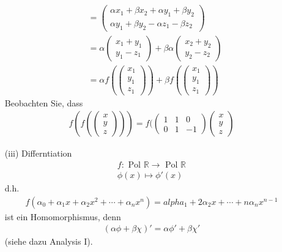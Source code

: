 \documentclass[11pt]{report}
\newcommand*\Zb[1] {\mathbb{#1}}
\begin{document}
\begin{itemize}
\begin{align}
 &= \begin{pmatrix} \alpha x_1 + \beta x_2 + \alpha y_1 + \beta y_2 \\ \alpha y_1 + \beta y_2 - \alpha z_1 - \beta z_2\end{pmatrix}\\
 &= \alpha \begin{pmatrix} x_1 + y_1 \\ y_1 - z_1\end{pmatrix} + \beta \alpha \begin{pmatrix} x_2 + y_2 \\ y_2 - z_2\end{pmatrix} \\
 &= \alpha f(\begin{pmatrix} x_1 \\ y_1 \\ z_1\end{pmatrix}) + \beta f(\begin{pmatrix} x_1 \\ y_1 \\ z_1\end{pmatrix})
\end{align}
Beobachten Sie, dass
\begin{align}
 f(f(\begin{pmatrix} x \\ y \\ z\end{pmatrix})) = f(\begin{pmatrix} 1 & 1 & 0 \\ 0 & 1 & -1\end{pmatrix} \begin{pmatrix} x \\ y \\ z\end{pmatrix}
\end{align}
\item[(iii)] Differntiation
\begin{align}
 f: \text{ Pol } \Zb{R} \rightarrow \text{ Pol }\Zb{R} \\
\phi(x) \mapsto \phi'(x)
\end{align}
d.h. 
\begin{align}
 f(\alpha_0+ \alpha_1 x + \alpha_2 x^2 + \cdots + \alpha_n x^n) = alpha_1 + 2\alpha_2 x + \cdots + n \alpha_n x^{n-1}
\end{align}
ist ein Homomorphismus, denn 
\begin{align}
 (\alpha \phi + \beta \chi)' = \alpha \phi' + \beta \chi'
\end{align}
(siehe dazu Analysis I). \\\\
\end{itemize}
\end{document}
